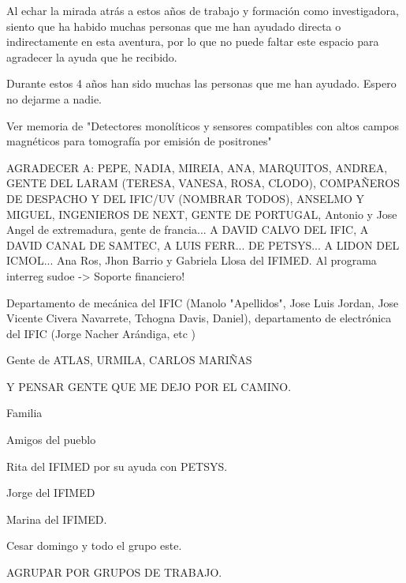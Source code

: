 Al echar la mirada atrás a estos años de trabajo y formación como investigadora, siento que ha habido muchas personas que me han ayudado directa o indirectamente en esta aventura, por lo que no puede faltar este espacio para agradecer la ayuda que he recibido.

Durante estos 4 años han sido muchas las personas que me han ayudado. Espero no dejarme a nadie.

Ver memoria de "Detectores monolíticos y sensores compatibles con altos campos magnéticos para tomografía por emisión de positrones"


AGRADECER A: PEPE, NADIA, MIREIA, ANA, MARQUITOS, ANDREA, GENTE DEL LARAM (TERESA, VANESA, ROSA, CLODO), COMPAÑEROS DE DESPACHO Y DEL IFIC/UV (NOMBRAR TODOS), ANSELMO Y MIGUEL, INGENIEROS DE NEXT, GENTE DE PORTUGAL, Antonio y Jose Angel de extremadura, gente de francia...  A DAVID CALVO DEL IFIC, A DAVID CANAL DE SAMTEC, A LUIS FERR... DE PETSYS... A LIDON DEL ICMOL... Ana Ros, Jhon Barrio y Gabriela Llosa del IFIMED. Al programa interreg sudoe -> Soporte financiero!

Departamento de mecánica del IFIC (Manolo "Apellidos", Jose Luis Jordan, Jose Vicente Civera Navarrete, Tchogna Davis, Daniel), departamento de electrónica del IFIC (Jorge Nacher Arándiga, etc )

Gente de ATLAS, URMILA, CARLOS MARIÑAS


Y PENSAR GENTE QUE ME DEJO POR EL CAMINO.

Familia

Amigos del pueblo

Rita del IFIMED por su ayuda con PETSYS.

Jorge del IFIMED 

Marina del IFIMED.

Cesar domingo y todo el grupo este.

AGRUPAR POR GRUPOS DE TRABAJO.